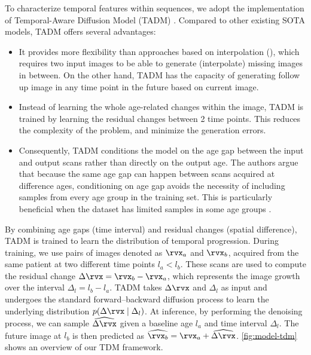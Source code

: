 
To characterize temporal features within sequences, we adopt the implementation of Temporal-Aware Diffusion Model (TADM) \cite{litricoTADMTemporallyAwareDiffusion2024}. Compared to other existing SOTA models, TADM offers several advantages: 
\begin{itemize}
    \item It provides more flexibility than approaches based on interpolation (\cite{lozuponeLDAE2025}), which requires two input images to be able to generate (interpolate) missing images in between. On the other hand, TADM has the capacity of generating follow up image in any time point in the future based on current image. 
    \item Instead of learning the whole age-related changes within the image, TADM is trained by learning the residual changes between 2 time points. This reduces the complexity of the problem, and minimize the generation errors. 
    \item Consequently, TADM conditions the model on the age gap between the input and output scans rather than directly on the output age. The authors argue that because the same age gap can happen between scans acquired at difference ages, conditioning on age gap avoids the necessity of including samples from every age group in the training set. This is particularly beneficial when the dataset has limited samples in some age groups \cite{litricoTADMTemporallyAwareDiffusion2024}.
\end{itemize}

By combining age gaps (time interval) and residual changes (spatial difference), TADM is trained to learn the distribution of temporal progression. During training, we use pairs of images denoted as $\rvx_a$ and $\rvx_b$, acquired from the same patient at two different time points $l_a < l_b$. These scans are used to compute the residual change $\Delta\rvx = \rvx_b - \rvx_a$, which represents the image growth over the interval $\Delta_l = l_b - l_a$. TADM takes $\Delta\rvx$ and $\Delta_l$ as input and undergoes the standard forward–backward diffusion process to learn the underlying distribution $p(\Delta\rvx \mid \Delta_l)$. At inference, by performing the denoising process, we can sample $\widehat{\Delta\rvx}$ given a baseline age $l_a$ and time interval $\Delta_l$. The future image at $l_b$ is then predicted as $\widehat{\rvx_b} = \rvx_a + \widehat{\Delta\rvx}$. \cref{fig:model-tdm} shows an overview of our TDM framework. 

